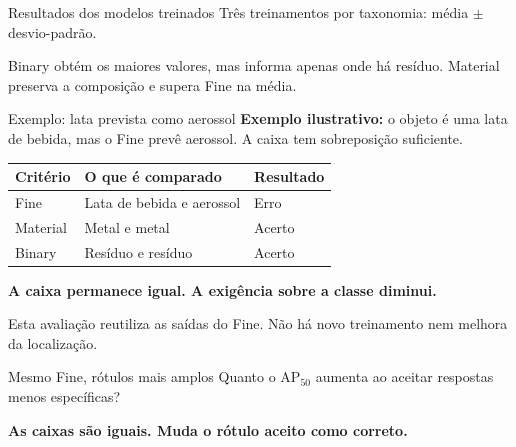 \documentclass[aspectratio=169,10pt]{beamer}
\begin{document}
\begin{frame}{Resultados dos modelos treinados}
  \vspace{0.06cm}
  {\fontsize{10.7}{13.9}\selectfont Três treinamentos por taxonomia: média $\pm$ desvio-padrão.}\par
  \vspace{0.18cm}
  \centering
  \renewcommand{\arraystretch}{1.15}
  {\fontsize{11.5}{14.8}\selectfont
  }\par
  \vspace{0.18cm}
  \raggedright
  {\fontsize{10.7}{13.9}\selectfont Binary obtém os maiores valores, mas informa apenas onde há resíduo. Material preserva a composição e supera Fine na média.}\par
\end{frame}

\begin{frame}{Exemplo: lata prevista como aerossol}
  \vspace{0.15cm}
  {\fontsize{11.5}{14.8}\selectfont\textbf{Exemplo ilustrativo:} o objeto é uma lata de bebida, mas o Fine prevê aerossol. A caixa tem sobreposição suficiente.}\par
  \vspace{0.21cm}
  \renewcommand{\arraystretch}{1.20}
  {\fontsize{10.7}{13.9}\selectfont
  \begin{tabular}{p{2.0cm}p{7.0cm}l}
    \toprule
    \textbf{Critério} & \textbf{O que é comparado} & \textbf{Resultado} \\
    \midrule
    Fine & Lata de bebida e aerossol & Erro \\
    Material & Metal e metal & Acerto \\
    Binary & Resíduo e resíduo & Acerto \\
    \bottomrule
  \end{tabular}}\par
  \vspace{0.24cm}
  {\color{ufpidark}\fontsize{12.3}{15.6}\selectfont\bfseries A caixa permanece igual. A exigência sobre a classe diminui.}\par
  \vspace{0.11cm}
  {\color{muted}\fontsize{9.0}{11.5}\selectfont Esta avaliação reutiliza as saídas do Fine. Não há novo treinamento nem melhora da localização.}
\end{frame}

\begin{frame}{Mesmo Fine, rótulos mais amplos}
  \vspace{0.15cm}
  {\fontsize{14}{18}\selectfont Quanto o AP$_{50}$ aumenta ao aceitar respostas menos específicas?}\par
  \vspace{0.35cm}
  \centering
  \renewcommand{\arraystretch}{1.40}
  {\fontsize{12}{16}\selectfont
  }\par
  \vspace{0.21cm}
  \raggedright
  {\color{ufpidark}\fontsize{13}{17}\selectfont\bfseries As caixas são iguais. Muda o rótulo aceito como correto.}\par
\end{frame}
\end{document}
